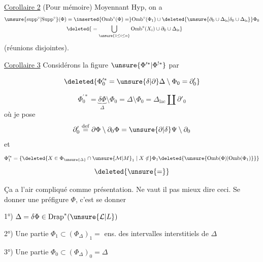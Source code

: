 
\uline{Corollaire 2} (Pour mémoire) Moyennant Hyp,  on a
\[
\begin{aligned}
\unsure{\mathrm{supp}^{\circ}|\mathrm{Supp}^{\circ}}(\Phi)&=\inserted{\mathrm{Omb}^{\circ}(\Phi)=}\mathrm{Omb}^{\circ}(\Phi_1)\cup\deleted{\unsure{\partial_0\cup\Delta_{\mathrm{is}}|\delta_0\cup\Delta_{\mathrm{is}}}}\Phi_0\\
&\deleted{{}=\bigcup_{\unsure{1\leq i\leq n}}\mathrm{Omb}^{\circ}(X_i)\cup\partial_0\cup\Delta_{\mathrm{is}}}
\end{aligned}
\]
(réunions disjointes).

\uline{Corollaire 3} Considérons la figure $\unsure{\Phi^{\prime *}|\Phi^{!*}}$  par

\[
\deleted{\Phi_0^{\prime *}=\unsure{\delta|\partial}\Delta\setminus\Phi_0=\partial'_0}
\]

\[
\Phi_0^{\prime *}=\underbrace{\delta\Phi}_{\Delta}\setminus\Phi_0=\Delta\setminus\Phi_0=\Delta_{\mathrm{lac}}\amalg\partial'_0
\]
où je pose
\[
\partial'_0\overset{\mathrm{def}}{=}\partial\Phi\setminus\partial_0\Phi=\unsure{\partial|\delta}\Psi\setminus\partial_0
\]
et
\[
\Phi_1^{\prime *}=\{\deleted{X\in\Phi_{\unsure{\Delta}}\cap\unsure{\mathcal{M}|M}_1\mid X\notin}\Phi_1\deleted{\unsure{\mathrm{Omb}(\Phi)|\mathrm{Omb}(\Phi_1)}}\}
\]
\[
\deleted{\unsure{=}}
\]

Ça a l'air  compliqué comme présentation. Ne vaut il pas mieux dire ceci. Se donner une préfigure $\Phi$, c'est se donner

1°) $\Delta=\delta\Phi\in\mathrm{Drap}^{*}(\unsure{\mathcal{L}|L})$

2°) Une partie $\Phi_1\subset(\Phi_{\Delta})_1={}$ ens. des intervalles interstitiels de $\Delta$

3°) Une partie $\Phi_0\subset(\Phi_{\Delta})_0=\Delta$
